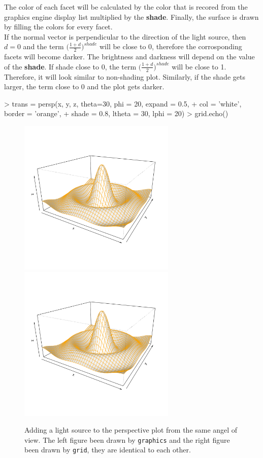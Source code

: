 \documentclass[paper=a4, fontsize=11pt]{report}
\begin{document}
The color of each facet will be calculated by the color that is recored from the graphics engine display list multiplied by the \textbf{shade}. Finally, the surface is drawn by filling the colors for every facet.\\

If the normal vector is perpendicular to the direction of the light source, then $d = 0$ and the term $\big(\frac{1 + d}{2}\big)^{shade}$ will be close to 0, therefore the corrosponding facets will become darker. The brightness and darkness will depend on the value of the \textbf{shade}. If shade close to 0, the term $\big(\frac{1 + d}{2}\big)^{shade}$ will be close to 1. Therefore, it will look similar to non-shading plot. Similarly, if the shade gets larger, the term close to 0 and the plot gets darker.

\begin{Schunk}
\begin{Sinput}
> trans = persp(x, y, z, theta=30, phi = 20, expand = 0.5,
+  col = 'white', border = 'orange', 
+  shade = 0.8, ltheta = 30, lphi = 20)
> grid.echo()
\end{Sinput}
\end{Schunk}


\begin{figure}[h]
\begin{center}
  \includegraphics[height = 7.5cm, width = 7.5cm]{figure/Lighting_1.pdf}
  \includegraphics[height = 7.5cm, width = 7.5cm]{figure/Lighting_2.pdf}
  \caption{Adding a light source to the perspective plot from the same angel of view. The left figure been drawn by \texttt{graphics} and the right figure been drawn by \texttt{grid}, they are identical to each other.}
  	\label{figure7}
\end{center}
\end{figure}
\end{document}
